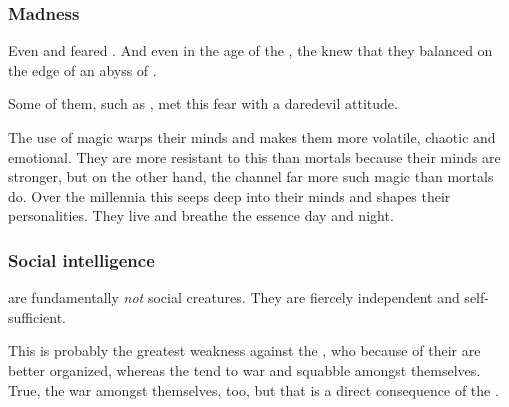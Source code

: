 \subsubsection{Madness}
Even \Sethicus and \Tiamat{} feared . 
And even in the age of the \thirdbanewar, the \dragons{} knew that they balanced on the edge of an abyss of . 



Some of them, such as \Ishnaruchaefir, met this fear with a  daredevil attitude. 

The \psp{\dragons}{} use of  magic warps their minds and makes them more volatile, chaotic and emotional. 
They are more resistant to this than mortals because their minds are stronger, but on the other hand, the \dragons{} channel far more such magic than mortals do. 
Over the millennia this seeps deep into their minds and shapes their personalities. 
They live and breathe the \xs{} essence day and night. 





\subsubsection{Social intelligence}
\Dragons{} are fundamentally \emph{not} social creatures. 
They are fiercely independent and self-sufficient. 

This is probably the \psp{\dragons}{} greatest weakness against the \resphain, who because of their  are better organized, whereas the \dragons{} tend to war and squabble amongst themselves. 
True, the \resphain{} war amongst themselves, too, but that is a direct consequence of the . 

